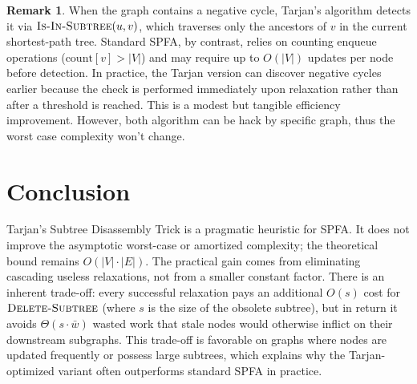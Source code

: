 \documentclass[a4paper]{article}
\theoremstyle{definition}
\newtheorem{remark}{Remark}
\begin{document}
\begin{remark}
When the graph contains a negative cycle, Tarjan's algorithm detects it via $\textsc{Is-In-Subtree}(u, v)$, which traverses only the ancestors of $v$ in the current shortest-path tree. Standard SPFA, by contrast, relies on counting enqueue operations ($\text{count}[v] > |V|$) and may require up to $O(|V|)$ updates per node before detection. In practice, the Tarjan version can discover negative cycles earlier because the check is performed immediately upon relaxation rather than after a threshold is reached. This is a modest but tangible efficiency improvement. However, both algorithm can be hack by specific graph, thus the worst case complexity won't change.
\end{remark}

\section{Conclusion} 

Tarjan's Subtree Disassembly Trick is a pragmatic heuristic for SPFA. It does not improve the asymptotic worst-case or amortized complexity; the theoretical bound remains $O(|V| \cdot |E|)$. The practical gain comes from eliminating cascading useless relaxations, not from a smaller constant factor. There is an inherent trade-off: every successful relaxation pays an additional $O(s)$ cost for $\textsc{Delete-Subtree}$ (where $s$ is the size of the obsolete subtree), but in return it avoids $\Theta(s \cdot \bar{w})$ wasted work that stale nodes would otherwise inflict on their downstream subgraphs. This trade-off is favorable on graphs where nodes are updated frequently or possess large subtrees, which explains why the Tarjan-optimized variant often outperforms standard SPFA in practice. 





\end{document}
